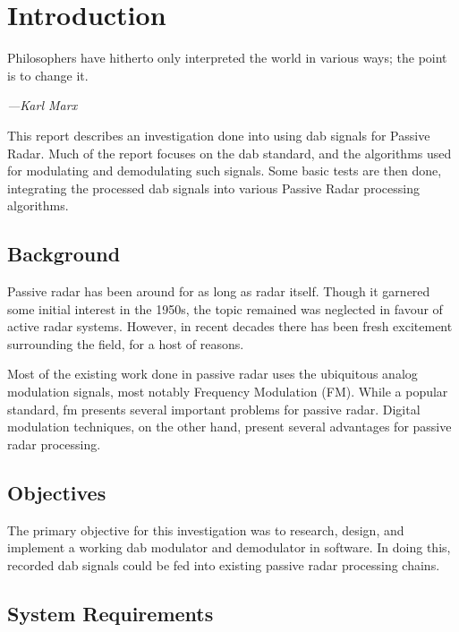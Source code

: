 \documentclass[class=report,11pt,crop=false]{standalone}
\begin{document}
\chapter{Introduction}
\epigraph{Philosophers have hitherto only interpreted the world in various ways; the point is to change it.}%
    {\emph{---Karl Marx}}

This report describes an investigation done into using \acrfull{dab} signals for Passive Radar. Much of the report focuses on the \acrshort{dab} standard, and the algorithms used for modulating and demodulating such signals. Some basic tests are then done, integrating the processed \acrshort{dab} signals into various Passive Radar processing algorithms.

\section{Background}
Passive radar has been around for as long as radar itself. Though it garnered some initial interest in the 1950s, the topic remained was neglected in favour of active radar systems. However, in recent decades there has been fresh excitement surrounding the field, for a host of reasons.

Most of the existing work done in passive radar uses the ubiquitous analog modulation signals, most notably Frequency Modulation (FM). While a popular standard, \acrfull{fm} presents several important problems for passive radar. Digital modulation techniques, on the other hand, present several advantages for passive radar processing.

\section{Objectives}
The primary objective for this investigation was to research, design, and implement a working \acrshort{dab} modulator and demodulator in software. In doing this, recorded \acrshort{dab} signals could be fed into existing passive radar processing chains. 

\section{System Requirements}
\end{document}
